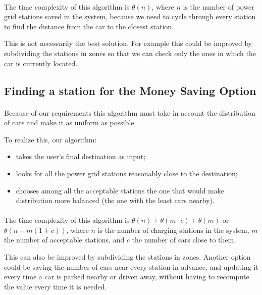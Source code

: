\documentclass[english]{article}
\begin{document}
\begin{itemize}
\paragraph{}
The time complexity of this algorithm is $\theta(n)$, where $n$ is the number of power grid stations saved in the system, because we need to cycle through every station to find the distance from the car to the closest station.

This is not necessarily the best solution. For example this could be improved by subdividing the stations in zones so that we can check only the ones in which the car is currently located.

\newpage
\subsection{Finding a station for the Money Saving Option}

	

\paragraph{}
Because of our requirements this algorithm must take in account the distribution of cars and make it as uniform as possible.

To realize this, our algorithm:
\begin{itemize}
	\item{takes the user's final destination as input;}
	\item{looks for all the power grid stations reasonably close to the destination;}
	\item{chooses among all the acceptable stations the one that would make distribution more balanced (the one with the least cars nearby).}
\end{itemize}

\paragraph{}
The time complexity of this algorithm is $\theta(n) + \theta(m \cdot c) + \theta(m)$ or $\theta(n + m (1+c))$, where $n$ is the number of charging stations in the system, $m$ the number of acceptable stations, and $c$ the number of cars close to them.

This can also be improved by subdividing the stations in zones.
Another option could be saving the number of cars near every station in advance, and updating it every time a car is parked nearby or driven away, without having to recompute the value every time it is needed.


\end{itemize}
\end{document}
